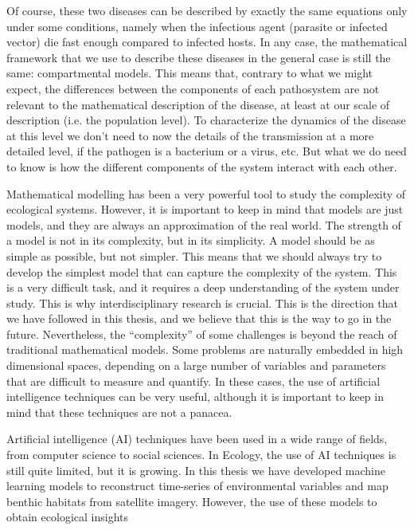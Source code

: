 Of course, these two diseases can be described by exactly the same equations
only under some conditions, namely when the infectious agent (parasite or
infected vector) die fast enough compared to infected hosts. In any case, the
mathematical framework that we use to describe these diseases in the general
case is still the same: compartmental models. This means that, contrary to what
we might expect, the differences between the components of each pathosystem are
not relevant to the mathematical description of the disease, at least at our
scale of description (i.e. the population level). To characterize the dynamics
of the disease at this level we don't need to now the details of the
transmission at a more detailed level, if the pathogen is a bacterium or a
virus, etc. But what we do need to know is how the different components of the
system interact with each other.

Mathematical modelling has been a very powerful tool to study the complexity of
ecological systems. However, it is important to keep in mind that models are
just models, and they are always an approximation of the real world. The
strength of a model is not in its complexity, but in its simplicity. A model
should be as simple as possible, but not simpler. This means that we should
always try to develop the simplest model that can capture the complexity of the
system. This is a very difficult task, and it requires a deep understanding of
the system under study. This is why interdisciplinary research is
crucial. This is the direction that we have followed in this thesis, and we
believe that this is the way to go in the future. Nevertheless, the
``complexity'' of some challenges is beyond the reach of traditional
mathematical models. Some problems are naturally embedded in high dimensional
spaces, depending on a large number of variables and parameters that are
difficult to measure and quantify. In these cases, the use of artificial
intelligence techniques can be very useful, although it is important to keep in
mind that these techniques are not a panacea.


Artificial intelligence (AI) techniques have been used in a wide range of
fields, from computer science to social sciences. In Ecology, the use of
AI techniques is still quite limited, but it is growing. In this thesis we have
developed machine learning models to reconstruct time-series of environmental
variables and map benthic habitats from satellite imagery. However, the use of
these models to obtain ecological insights

